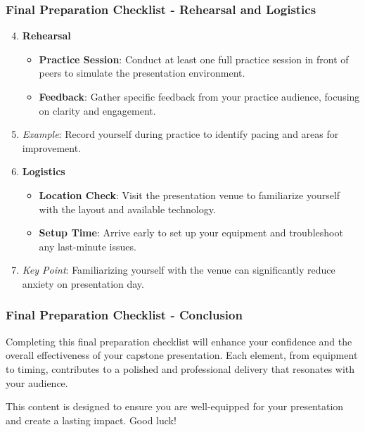 \documentclass[aspectratio=169]{beamer}
\begin{document}
\begin{frame}[fragile]
    \frametitle{Final Preparation Checklist - Rehearsal and Logistics}
    \begin{enumerate}
        \setcounter{enumi}{3} %
        \item \textbf{Rehearsal}
        \begin{itemize}
            \item \textbf{Practice Session}: Conduct at least one full practice session in front of peers to simulate the presentation environment.
            \item \textbf{Feedback}: Gather specific feedback from your practice audience, focusing on clarity and engagement.
        \end{itemize}
        \item \textit{Example}: Record yourself during practice to identify pacing and areas for improvement.
        
        \item \textbf{Logistics}
        \begin{itemize}
            \item \textbf{Location Check}: Visit the presentation venue to familiarize yourself with the layout and available technology.
            \item \textbf{Setup Time}: Arrive early to set up your equipment and troubleshoot any last-minute issues.
        \end{itemize}
        \item \textit{Key Point}: Familiarizing yourself with the venue can significantly reduce anxiety on presentation day.
    \end{enumerate}
\end{frame}

\begin{frame}[fragile]
    \frametitle{Final Preparation Checklist - Conclusion}
    Completing this final preparation checklist will enhance your confidence and the overall effectiveness of your capstone presentation. 
    Each element, from equipment to timing, contributes to a polished and professional delivery that resonates with your audience.
    
    This content is designed to ensure you are well-equipped for your presentation and create a lasting impact. Good luck!
\end{frame}
\end{document}
